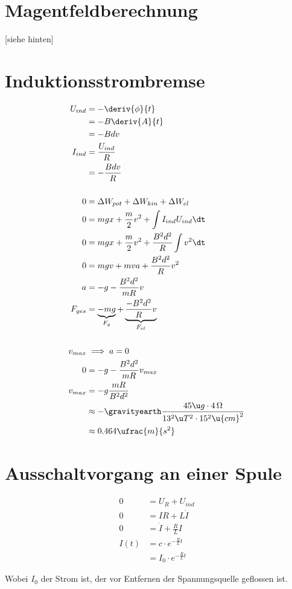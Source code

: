 \documentclass[11pt]{article}
\begin{document}
\section{Magentfeldberechnung}
\begin{center}
    [siehe hinten]
\end{center} 

\section{Induktionsstrombremse}
\begin{align*}
    U_{ind} &= - \deriv{\phi}{t}\\
    &= - B \deriv{A}{t}\\
    &= - B d v\\
    I_{ind} &= \frac{U_{ind}}{R}\\
    &= - \frac{B d v}{R}\\
    \\
    0 &= \Delta W_{pot} + \Delta W_{kin} + \Delta W_{el}\\
    0 &= m g x + \frac m2 v^2 + \int I_{ind} U_{ind} \dt\\
    0 &= m g x + \frac m2 v^2 + \frac{B^2 d^2 }{R} \int v^2 \dt\\
    0 &= m g v + m v a + \frac{B^2 d^2 }{R} v^2 \\
    a &= - g - \frac{B^2 d^2 }{m R} v \\
    F_{ges} &= \underbrace{- m g}_{F_{g}} + \underbrace{ \frac{-B^2 d^2 }{R} v}_{F_{el}} \\
    \\
    v_{max} &\implies a=0 \\
    0 &= - g - \frac{B^2 d^2 }{m R} v_{max} \\
    v_{max} &= -g \frac{m R}{B^2 d^2}\\
    &\approx -\gravityearth \frac{45\u g \cdot4\,\Omega}{13^2 \u T^2 \cdot 15^2\u{cm}^2}\\
    &\approx 0.464 \ufrac{m}{s^2}
\end{align*}

\section{Ausschaltvorgang an einer Spule}
\begin{align*}
    0 &=  U_R + U_{ind}\\
    0 &=  I R + L \dot I\\
    0 &=  \dot I + \frac RL I \\
    I(t)  &= c \cdot e^{-\frac RL t}\\
    &= I_0 \cdot e^{-\frac RL t}
\end{align*}
\begin{adjustwidth}{20pt}{}
    Wobei \(I_0\) der Strom ist, der vor Entfernen der Spannungsquelle
    geflossen ist.
\end{adjustwidth}
\end{document}
